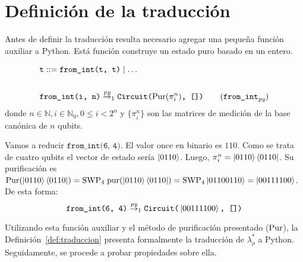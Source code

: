\section{Definición de la traducción}
Antes de definir la traducción resulta necesario agregar una pequeña función auxiliar a Python. Está función construye un estado puro basado en un entero.
\begin{definicion}
    \begin{align*}
        &\texttt{t} ::= \texttt{from\_int(t, t)} \mid \dots\\\\
        &\texttt{from\_int(i, n)} \redpy_1 \texttt{Circuit(}\Pur(\pi^n_i)\texttt{, [])} \tag{$\texttt{from\_int}_\textit{py}$}
    \end{align*}
    donde $n\in\mathbb{N},i\in\mathbb{N}_0, 0\leq i<2^n$ y $\{\pi^n_i\}$ son las matrices de medición de la base canónica de $n$ qubits.
\end{definicion}
\begin{ejemplo}
    Vamos a reducir $\texttt{from\_int(6, 4)}$. El valor once en binario es $110$. Como se trata de cuatro qubits el vector de estado sería $\ket{0110}$.
    Luego, $\pi^n_i=\ket{0110}\bra{0110}$. Su purificación es $\text{Pur}(\ket{0110}\bra{0110})=\text{SWP}_4\;\text{pur}(\ket{0110}\bra{0110}) = \text{SWP}_4\ket{01100110} = \ket{00111100}$. De esta forma:
    \[\texttt{from\_int(6, 4)} \overset{\textit{py}}{\rightarrow}_1 \texttt{Circuit(}\ket{00111100}\texttt{, [])}\]
\end{ejemplo}
Utilizando esta función auxiliar y el método de purificación presentado ($\text{Pur}$), la Definición~\ref{def:traduccion} presenta formalmente la traducción de $\lambda_\rho^*$ a Python. Seguidamente, se procede a probar propiedades sobre ella.


